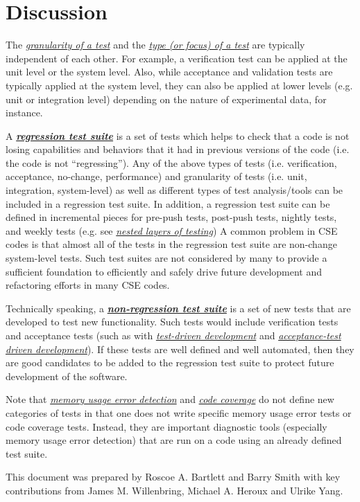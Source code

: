 \documentclass[]{article}
\begin{document}
\hypertarget{discussion}{\section{Discussion}\label{discussion}}

The \protect\hyperlink{granularity-of-tests}{\emph{granularity of a
test}} and the \protect\hyperlink{types-of-tests}{\emph{type (or focus)
of a test}} are typically independent of each other. For example, a
verification test can be applied at the unit level or the system level.
Also, while acceptance and validation tests are typically applied at the
system level, they can also be applied at lower levels (e.g. unit or
integration level) depending on the nature of experimental data, for
instance.

A
\href{http://en.wikipedia.org/wiki/Regression_testing}{\textbf{\emph{regression
test suite}}} is a set of tests which helps to check that a code is not
losing capabilities and behaviors that it had in previous versions of
the code (i.e. the code is not ``regressing''). Any of the above types
of tests (i.e. verification, acceptance, no-change, performance) and
granularity of tests (i.e. unit, integration, system-level) as well as
different types of test analysis/tools can be included in a regression
test suite. In addition, a regression test suite can be defined in
incremental pieces for pre-push tests, post-push tests, nightly tests,
and weekly tests (e.g. see
\href{https://tribits.org/doc/TribitsDevelopersGuide.html\#nested-layers-of-tribits-project-testing}{\emph{nested
layers of testing}}) A common problem in CSE codes is that almost all of
the tests in the regression test suite are non-change system-level
tests. Such test suites are not considered by many to provide a
sufficient foundation to efficiently and safely drive future development
and refactoring efforts in many CSE codes.

Technically speaking, a
\href{http://en.wikipedia.org/wiki/Non-regression_testing}{\textbf{\emph{non-regression
test suite}}} is a set of new tests that are developed to test new
functionality. Such tests would include verification tests and
acceptance tests (such as with
\href{http://en.wikipedia.org/wiki/Test-driven_development}{\emph{test-driven
development}} and
\href{http://en.wikipedia.org/wiki/Acceptance_test-driven_development}{\emph{acceptance-test
driven development}}). If these tests are well defined and well
automated, then they are good candidates to be added to the regression
test suite to protect future development of the software.

Note that \protect\hyperlink{id.6n6lrjjln67m}{\emph{memory usage error
detection}} and \protect\hyperlink{id.sxuj9tgusjrf}{\emph{code
coverage}} do not define new categories of tests in that one does not
write specific memory usage error tests or code coverage tests. Instead,
they are important diagnostic tools (especially memory usage error
detection) that are run on a code using an already defined test suite.

This document was prepared by Roscoe A. Bartlett and Barry Smith with
key contributions from James M. Willenbring, Michael A. Heroux and
Ulrike Yang.
\end{document}
